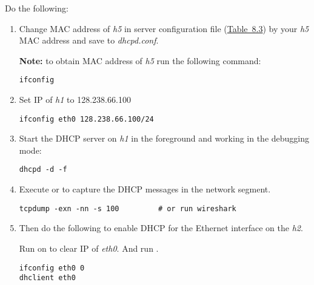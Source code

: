 \documentclass{../UTNetLab}
\begin{document}
Do the following:

\begin{enumerate}
    \item Change MAC address of \textit{h5} in server configuration file (\hyperref[tab:8.3]{Table~8.3}) by your \textit{h5} MAC address and save to \textit{dhcpd.conf}.

          \textbf{Note: }to obtain MAC address of \textit{h5} run the following command:

          \begin{lstlisting}
ifconfig
          \end{lstlisting}

    \item Set IP of \textit{h1} to {128.238.66.100}
 
          \begin{lstlisting}
ifconfig eth0 128.238.66.100/24
   	      \end{lstlisting}


    \item Start the DHCP server on \textit{h1} in the foreground and working in the debugging mode:

          \begin{lstlisting}
dhcpd -d -f
          \end{lstlisting}


    \item Execute  or  to capture the DHCP messages in the network segment.

          \begin{lstlisting}
tcpdump -exn -nn -s 100			# or run wireshark
          \end{lstlisting}

    \item Then do the following to enable DHCP for the Ethernet interface on the \textit{h2}.

          Run  on  to clear IP of \textit{eth0}.
          And run .

          \begin{lstlisting}
ifconfig eth0 0
dhclient eth0
          \end{lstlisting}


\end{enumerate}
\end{document}
